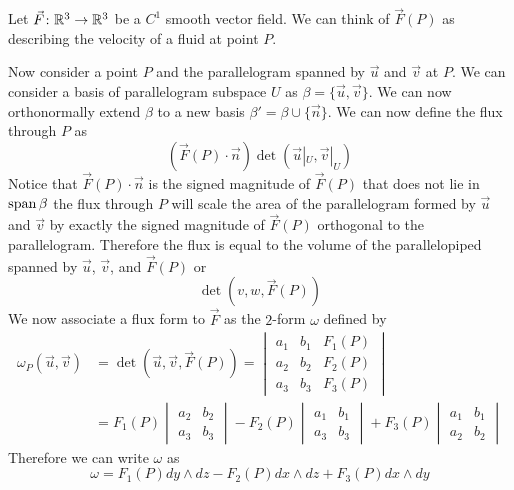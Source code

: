 \documentclass[notes]{subfiles}
\begin{document}
\begin{example}
    Let $\vec{F}\colon \mathbb{R}^3 \to \mathbb{R}^3$ be a $C^1$ smooth vector field. We can think of $\vec{F}(P)$ as describing the velocity of a fluid at point $P$.

    Now consider a point $P$ and the parallelogram spanned by $\vec{u}$ and $\vec{v}$ at $P$. We can consider a basis of parallelogram subspace $U$ as $\beta = \{ \vec{u}, \vec{v} \}$. We can now orthonormally extend $\beta$ to a new basis $\beta' = \beta \cup \{ \vec{n} \}$. We can now define the flux through $P$ as
    \[
        (\vec{F}(P)\cdot\vec{n})\det(\vec{u}|_U, \vec{v}|_U)
    \]
    Notice that $\vec{F}(P)\cdot\vec{n}$ is the signed magnitude of $\vec{F}(P)$ that does not lie in $\operatorname{span} \beta$ the flux through $P$ will scale the area of the parallelogram formed by $\vec{u}$ and $\vec{v}$ by exactly the signed magnitude of $\vec{F}(P)$ orthogonal to the parallelogram. Therefore the flux is equal to the volume of the parallelopiped spanned by $\vec{u}$, $\vec{v}$, and $\vec{F}(P)$ or
    \[
        \det(v, w, \vec{F}(P))
    \]
    We now associate a flux form to $\vec{F}$ as the $2$-form $\omega$ defined by
    \begin{align*}
        \omega_P(\vec{u}, \vec{v})
        &= \det(\vec{u}, \vec{v}, \vec{F}(P))
        = \begin{vmatrix}
            a_1 & b_1 & F_1(P) \\
            a_2 & b_2 & F_2(P) \\
            a_3 & b_3 & F_3(P)
        \end{vmatrix} \\
        &= F_1(P)\begin{vmatrix}
            a_2 & b_2 \\
            a_3 & b_3
        \end{vmatrix}
        - F_2(P)\begin{vmatrix}
            a_1 & b_1 \\
            a_3 & b_3
        \end{vmatrix}
        + F_3(P)\begin{vmatrix}
            a_1 & b_1 \\
            a_2 & b_2
        \end{vmatrix}
    \end{align*}
    Therefore we can write $\omega$ as
    \[
        \omega = F_1(P)dy\wedge dz - F_2(P)dx\wedge dz + F_3(P)dx \wedge dy
    \]
\end{example}
\end{document}
